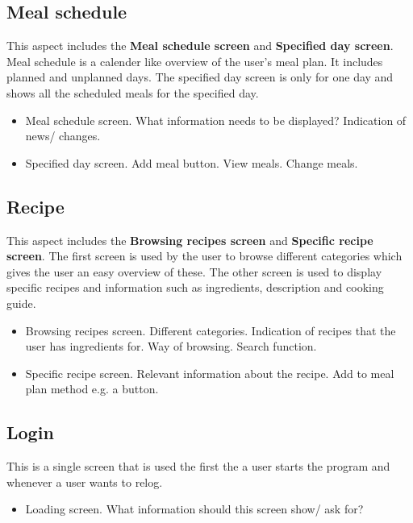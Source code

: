 \subsection{Meal schedule}
This aspect includes the \textbf{Meal schedule screen} and \textbf{Specified day screen}. Meal schedule is a calender like overview of the user's meal plan. It includes planned and unplanned days. The specified day screen is only for one day and shows all the scheduled meals for the specified day.

\begin{itemize}
	\item Meal schedule screen.
		\subitem What information needs to be displayed? 
		\subitem Indication of news/ changes.
	\item Specified day screen.
		\subitem Add meal button.
		\subitem View meals.
		\subitem Change meals.
\end{itemize}

\subsection{Recipe}
This aspect includes the \textbf{Browsing recipes screen} and \textbf{Specific recipe screen}. The first screen is used by the user to browse different categories which gives the user an easy overview of these. The other screen is used to display specific recipes and information such as ingredients, description and cooking guide.

\begin{itemize}
	\item Browsing recipes screen.
		\subitem Different categories. 
		\subitem Indication of recipes that the user has ingredients for.
		\subitem Way of browsing.
		\subitem Search function.
	\item Specific recipe screen.
		\subitem Relevant information about the recipe.
		\subitem Add to meal plan method e.g. a button.
\end{itemize}

\subsection{Login}
This is a single screen that is used the first the a user starts the program and whenever a user wants to relog.

\begin{itemize}
	\item Loading screen.
		\subitem What information should this screen show/ ask for?
\end{itemize}

